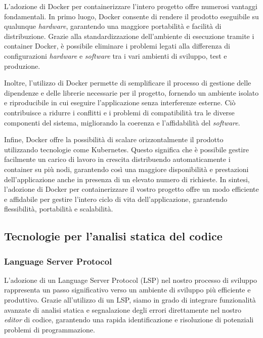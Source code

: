 L'adozione di Docker per containerizzare l'intero progetto offre numerosi
vantaggi fondamentali. In primo luogo, Docker consente di rendere il prodotto
eseguibile su qualunque \textit{hardware}, garantendo una maggiore portabilità e
facilità di distribuzione. Grazie alla standardizzazione dell'ambiente di
esecuzione tramite i container Docker, è possibile eliminare i problemi legati
alla differenza di configurazioni \textit{hardware} e \textit{software} tra i
vari ambienti di sviluppo, test e produzione.

Inoltre, l'utilizzo di Docker permette di semplificare il processo di gestione
delle dipendenze e delle librerie necessarie per il progetto, fornendo un
ambiente isolato e riproducibile in cui eseguire l'applicazione senza
interferenze esterne. Ciò contribuisce a ridurre i conflitti e i problemi di
compatibilità tra le diverse componenti del sistema, migliorando la coerenza e
l'affidabilità del \textit{software}.

Infine, Docker offre la possibilità di scalare orizzontalmente il prodotto
utilizzando tecnologie come Kubernetes. Questo significa che è possibile gestire
facilmente un carico di lavoro in crescita distribuendo automaticamente i
container su più nodi, garantendo così una maggiore disponibilità e prestazioni
dell'applicazione anche in presenza di un elevato numero di richieste. In
sintesi, l'adozione di Docker per containerizzare il vostro progetto offre un
modo efficiente e affidabile per gestire l'intero ciclo di vita
dell'applicazione, garantendo flessibilità, portabilità e scalabilità.

\subsection{Tecnologie per l'analisi statica del codice}

\subsubsection{Language Server Protocol}

L'adozione di un Language Server Protocol (LSP) nel nostro processo di sviluppo
rappresenta un passo significativo verso un ambiente di sviluppo più efficiente
e produttivo. Grazie all'utilizzo di un LSP, siamo in grado di integrare
funzionalità avanzate di analisi statica e segnalazione degli errori
direttamente nel nostro \textit{editor} di codice, garantendo una rapida
identificazione e risoluzione di potenziali problemi di programmazione.


